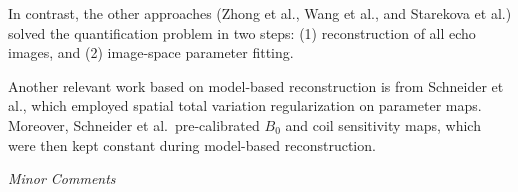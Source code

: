 \documentclass[a4paper,11pt]{report}
\begin{document}
\begin{enumerate}
\hspace{1em} In contrast, the other approaches (Zhong et al., Wang et al., and Starekova et al.) 
solved the quantification problem in two steps: 
(1) reconstruction of all echo images, and (2) image-space parameter fitting. 

\hspace{1em} Another relevant work based on model-based reconstruction is from Schneider et al., 
which employed spatial total variation regularization on parameter maps. 
Moreover, Schneider et al.~pre-calibrated $B_0$ and coil sensitivity maps, 
which were then kept constant during model-based reconstruction.

\end{enumerate}

\noindent \textit{Minor Comments}
\end{document}
